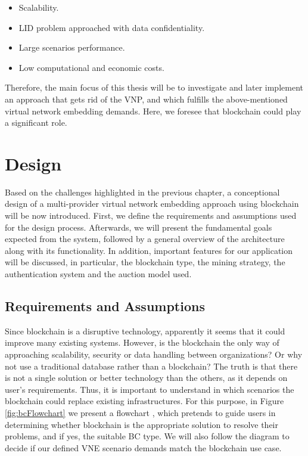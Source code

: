 \begin{itemize}
	\item Scalability.
	\item LID problem approached with data confidentiality.
	\item Large scenarios performance.
	\item Low computational and economic costs.
\end{itemize}

Therefore, the main focus of this thesis will be to investigate and later implement an approach that gets rid of the VNP, and which fulfills the above-mentioned virtual network embedding demands. Here, we foresee that blockchain could play a significant role.


\chapter{Design}
\label{ch:design}

Based on the challenges highlighted in the previous chapter, a conceptional design of a multi-provider virtual network embedding approach using blockchain will be now introduced. First, we define the requirements and assumptions used for the design process. Afterwards, we will present the fundamental goals expected from the system, followed by a general overview of the architecture along with its functionality. In addition, important features for our application will be discussed, in particular, the blockchain type, the mining strategy, the authentication system and the auction model used.

\section{Requirements and Assumptions} \label{requirements}

Since blockchain is a disruptive technology, apparently it seems that it could improve many existing systems. However, is the blockchain the only way of approaching scalability, security or data handling between organizations? Or why not use a traditional database rather than a blockchain? The truth is that there is not a single solution or better technology than the others, as it depends on user's requirements. Thus, it is important to understand in which scenarios the blockchain could replace existing infrastructures. For this purpose, in Figure \ref{fig:bcFlowchart} we present a flowchart \citep{wust2017you}, which pretends to guide users in determining whether blockchain is the appropriate solution to resolve their problems, and if yes, the suitable BC type. We will also follow the diagram to decide if our defined VNE scenario demands match the blockchain use case.

